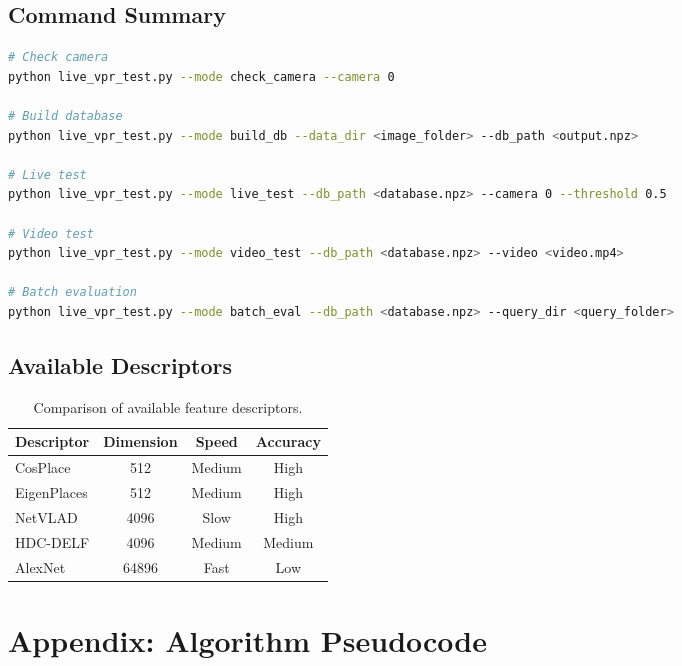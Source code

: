 \documentclass[11pt,a4paper]{article}
\begin{document}
\subsection{Command Summary}

\begin{lstlisting}[language=bash, caption=Quick reference commands]
# Check camera
python live_vpr_test.py --mode check_camera --camera 0

# Build database
python live_vpr_test.py --mode build_db --data_dir <image_folder> --db_path <output.npz>

# Live test
python live_vpr_test.py --mode live_test --db_path <database.npz> --camera 0 --threshold 0.5

# Video test
python live_vpr_test.py --mode video_test --db_path <database.npz> --video <video.mp4>

# Batch evaluation
python live_vpr_test.py --mode batch_eval --db_path <database.npz> --query_dir <query_folder>
\end{lstlisting}

\subsection{Available Descriptors}

\begin{table}[H]
    \centering
    \begin{tabular}{lccc}
        \toprule
        \textbf{Descriptor} & \textbf{Dimension} & \textbf{Speed} & \textbf{Accuracy} \\
        \midrule
        CosPlace & 512 & Medium & High \\
        EigenPlaces & 512 & Medium & High \\
        NetVLAD & 4096 & Slow & High \\
        HDC-DELF & 4096 & Medium & Medium \\
        AlexNet & 64896 & Fast & Low \\
        \bottomrule
    \end{tabular}
    \caption{Comparison of available feature descriptors.}
\end{table}

\newpage
\section{Appendix: Algorithm Pseudocode}
\end{document}
